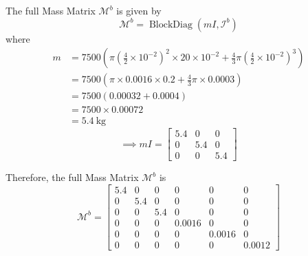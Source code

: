The full Mass Matrix \( \mathcal{M}^{b} \) is given by
\begin{equation}
    \mathcal{M}^{b}=\operatorname{BlockDiag}\left(m I, \mathcal{I}^{b}\right)
\end{equation}
where
\begin{align*}
    m & =7500\left(\pi\left(\frac{4}{2} \times 10^{-2}\right)^{2} \times 20 \times 10^{-2}+\frac{4}{3} \pi\left(\frac{4}{2} \times 10^{-2}\right)^{3}\right) \\
      & =7500\left(\pi \times 0.0016 \times 0.2+\frac{4}{3} \pi \times 0.0003\right)                                                                         \\
      & =7500\left(0.00032+0.0004\right)                                                                                                                     \\
      & =7500 \times 0.00072                                                                                                                                 \\
      & =5.4 \mathrm{~kg}
\end{align*}
\begin{equation}
    \implies
    m I=\begin{bmatrix}
        5.4 & 0   & 0   \\
        0   & 5.4 & 0   \\
        0   & 0   & 5.4
    \end{bmatrix}
\end{equation}

Therefore, the full Mass Matrix \( \mathcal{M}^{b} \) is
\begin{equation}
    \mathcal{M}^{b}=\begin{bmatrix}
        5.4 & 0   & 0   & 0      & 0      & 0      \\
        0   & 5.4 & 0   & 0      & 0      & 0      \\
        0   & 0   & 5.4 & 0      & 0      & 0      \\
        0   & 0   & 0   & 0.0016 & 0      & 0      \\
        0   & 0   & 0   & 0      & 0.0016 & 0      \\
        0   & 0   & 0   & 0      & 0      & 0.0012
    \end{bmatrix}
\end{equation}

